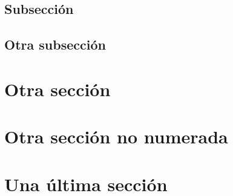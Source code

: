 \documentclass[12pt,a4paper,twoside]{article}
\begin{document}
\lipsum[1-15]

\subsection{Subsección}

\lipsum[1-15]

\subsection{Otra subsección}

\lipsum[1-15]		

\section{Otra sección}

\lipsum[1-15]	

\section*{Otra sección no numerada}

\ifdefined\HCode\else
{}
\fi

\lipsum[1-15]			

\section{Una última sección}

\lipsum[1-15]	
\end{document}

